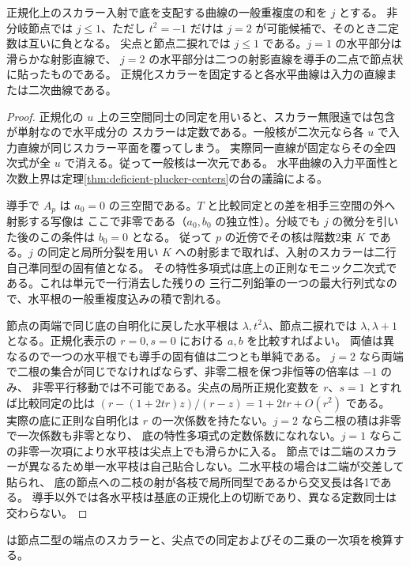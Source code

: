 \begin{proposition}\label{prop:singular-horizontal-gluing}
正規化上のスカラー入射で底を支配する曲線の一般重複度の和を $j$ とする。
非分岐節点では $j\le1$、ただし $t^2=-1$ だけは $j=2$ が可能候補で、そのとき二定数は互いに負となる。
尖点と節点二捩れでは $j\le1$ である。$j=1$ の水平部分は滑らかな射影直線で、
$j=2$ の水平部分は二つの射影直線を導手の二点で節点状に貼ったものである。
正規化スカラーを固定すると各水平曲線は入力の直線または二次曲線である。
\end{proposition}
\begin{proof}
正規化の $u$ 上の三空間同士の同定を用いると、スカラー無限遠では包含が単射なので水平成分の
スカラーは定数である。一般核が二次元なら各 $u$ で入力直線が同じスカラー平面を覆ってしまう。
実際同一直線が固定ならその全四次式が全 $u$ で消える。従って一般核は一次元である。
水平曲線の入力平面性と次数上界は定理\ref{thm:deficient-plucker-centers}の台の議論による。

導手で $A_p$ は $a_0=0$ の三空間である。$T$ と比較同定との差を相手三空間の外へ射影する写像は
ここで非零である（$a_0,b_0$ の独立性）。分岐でも $j$ の微分を引いた後のこの条件は $b_0=0$ となる。
従って $p$ の近傍でその核は階数2束 $K$ である。$j$ の同定と局所分裂を用い
$K$ への射影まで取れば、入射のスカラーは二行自己準同型の固有値となる。
その特性多項式は底上の正則なモニック二次式である。これは単元で一行消去した残りの
三行二列鉛筆の一つの最大行列式なので、水平根の一般重複度込みの積で割れる。

節点の両端で同じ底の自明化に戻した水平根は $\lambda,t^2\lambda$、節点二捩れでは
$\lambda,\lambda+1$ となる。正規化表示の $r=0,s=0$ における $a,b$ を比較すればよい。
両値は異なるので一つの水平根でも導手の固有値は二つとも単純である。
$j=2$ なら両端で二根の集合が同じでなければならず、非零二根を保つ非恒等の倍率は $-1$ のみ、
非零平行移動では不可能である。尖点の局所正規化変数を $r$、$s=1$ とすれば比較同定の比は
$(r-(1+2tr)z)/(r-z)=1+2tr+O(r^2)$ である。
実際の底に正則な自明化は $r$ の一次係数を持たない。$j=2$ なら二根の積は非零で一次係数も非零となり、
底の特性多項式の定数係数になれない。$j=1$ ならこの非零一次項により水平枝は尖点上でも滑らかに入る。
節点では二端のスカラーが異なるため単一水平枝は自己貼合しない。二水平枝の場合は二端が交差して貼られ、
底の節点への二枝の射が各枝で局所同型であるから交叉長は各1である。
導手以外では各水平枝は基底の正規化上の切断であり、異なる定数同士は交わらない。
\end{proof}

 は節点二型の端点のスカラーと、尖点での同定およびその二乗の一次項を検算する。
